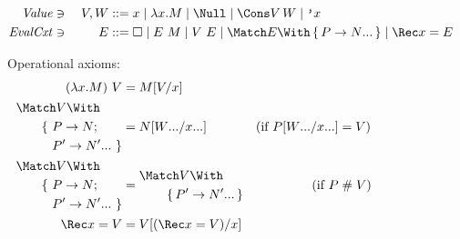 \documentclass[runningheads]{llncs}
\begin{document}
\begin{figure}
\centering
  
\begin{alignat*}{2}
  \mathit{Value} &\ni{}& V, W
  &::= x
  \mid \lambda x. M
  \mid \Null
  \mid \Cons V \, W
  \mid \q{x}
  \\
  \mathit{EvalCxt} &\ni{}& E
  &::= \hole
  \mid E ~ M
  \mid V ~ E
  \mid \Match E \With \set{\many{P \to N}}
  \mid \Rec x = E
\end{alignat*}

Operational axioms:
\begin{align*}
  (\lambda x. M) ~ V
  &=
  M\subst{x}{V}
  \\
  \begin{aligned}
    &\Match V \With \\
    &\qquad
    \begin{aligned}[t]
    \{~ &P \to N; \\
    &\many{P' \to N'}~\}
    \end{aligned}
  \end{aligned}
  &=
  N\subst{\many{x}}{\many{W}}
  &(\text{if } P\subst{\many{x}}{\many{W}} &= V)
  \\
  \begin{aligned}
    &\Match V \With \\
    &\qquad
    \begin{aligned}[t]
    \{~ &P \to N; \\
    &\many{P' \to N'}~\}
    \end{aligned}
  \end{aligned}
  &=
  \begin{aligned}
    &\Match V \With \\
    &\qquad \set{\many{P' \to N'}}
  \end{aligned}
  &(\text{if } P &\apart V)
  \\
  \Rec x = V
  &=
  V\subst{x}{(\Rec x = V)}
\end{align*}


\end{figure}
\end{document}
